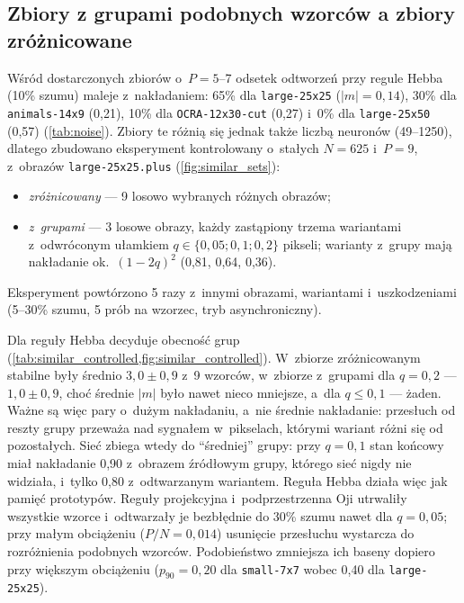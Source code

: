 \documentclass[11pt,a4paper]{article}
\newcommand{\tabfile}[1]{\resizebox{\linewidth}{!}{}}
\begin{document}
\begin{table}[!htb]
  \centering
  \caption{Odtwarzanie (asynchronicznie): odsetek dokładnych odtworzeń (\enquote{dokł.})
  i~średnie nakładanie końcowe (\enquote{nakł.}) przy 10\% i~30\% szumu dla reguł Hebba (H),
  Oji, podprzestrzennej Oji (S) i~projekcyjnej (P); $p_{90}$ --- największy szum, przy którym
  reguła projekcyjna odtwarza $\ge90\%$ wzorców.}
  \label{tab:noise}
  \tabfile{critical_noise}
\end{table}

\subsection{Zbiory z grupami podobnych wzorców a zbiory zróżnicowane}
\label{sec:q5}

Wśród dostarczonych zbiorów o~$P=5$--7 odsetek odtworzeń przy regule Hebba (10\% szumu) maleje
z~nakładaniem: 65\% dla \texttt{large-25x25} ($|m|=0{,}14$), 30\% dla \texttt{animals-14x9}
(0{,}21), 10\% dla \texttt{OCRA-12x30-cut} (0{,}27) i~0\% dla \texttt{large-25x50} (0{,}57)
(\cref{tab:noise}). Zbiory te różnią się jednak także liczbą neuronów (49--1250), dlatego
zbudowano eksperyment kontrolowany o~stałych $N=625$ i~$P=9$, z~obrazów
\texttt{large-25x25.plus} (\cref{fig:similar_sets}):
\begin{itemize}
  \item \emph{zróżnicowany} --- 9 losowo wybranych różnych obrazów;
  \item \emph{z~grupami} --- 3 losowe obrazy, każdy zastąpiony trzema wariantami z~odwróconym
  ułamkiem $q\in\{0{,}05;0{,}1;0{,}2\}$ pikseli; warianty z~grupy mają nakładanie
  ok.~$(1-2q)^2$ (0{,}81, 0{,}64, 0{,}36).
\end{itemize}
Eksperyment powtórzono 5 razy z~innymi obrazami, wariantami i~uszkodzeniami (5--30\% szumu,
5 prób na wzorzec, tryb asynchroniczny).

Dla reguły Hebba decyduje obecność grup (\cref{tab:similar_controlled,fig:similar_controlled}).
W~zbiorze zróżnicowanym stabilne były średnio $3{,}0\pm0{,}9$ z~9 wzorców, w~zbiorze z~grupami
dla $q=0{,}2$ --- $1{,}0\pm0{,}9$, choć średnie $|m|$ było nawet nieco mniejsze, a~dla
$q\le0{,}1$ --- żaden. Ważne są więc pary o~dużym nakładaniu, a~nie średnie nakładanie: przesłuch
od reszty grupy przeważa nad sygnałem w~pikselach, którymi wariant różni się od pozostałych.
Sieć zbiega wtedy do \enquote{średniej} grupy: przy $q=0{,}1$ stan końcowy miał nakładanie
0{,}90 z~obrazem źródłowym grupy, którego sieć nigdy nie widziała, i~tylko 0{,}80
z~odtwarzanym wariantem. Reguła Hebba działa więc jak pamięć prototypów. Reguły projekcyjna
i~podprzestrzenna Oji utrwaliły wszystkie wzorce i~odtwarzały je bezbłędnie do 30\% szumu nawet
dla $q=0{,}05$; przy małym obciążeniu ($P/N=0{,}014$) usunięcie przesłuchu wystarcza do
rozróżnienia podobnych wzorców. Podobieństwo zmniejsza ich baseny dopiero przy większym
obciążeniu ($p_{90}=0{,}20$ dla \texttt{small-7x7} wobec 0{,}40 dla \texttt{large-25x25}).
\end{document}
